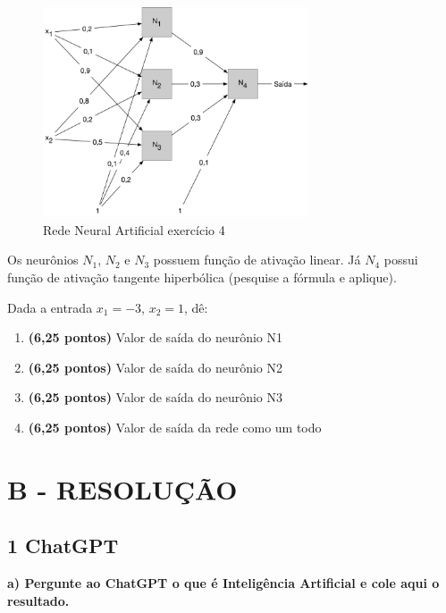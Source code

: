     \begin{figure}[H]
        \centering
        \includegraphics[width=0.7\textwidth]{apendices/fig/1_IAA001_3.png} 
        \caption{Rede Neural Artificial exercício 4}
    \end{figure}

    Os neurônios $N_1$, $N_2$ e $N_3$ possuem função de ativação linear. Já $N_4$ possui função de ativação tangente hiperbólica (pesquise a fórmula e aplique).

    Dada a entrada $x_1 = -3$, $x_2 = 1$, dê:
    \begin{enumerate}[label=\alph*)]
        \item \textbf{(6,25 pontos)} Valor de saída do neurônio N1
        \item \textbf{(6,25 pontos)} Valor de saída do neurônio N2
        \item \textbf{(6,25 pontos)} Valor de saída do neurônio N3
        \item \textbf{(6,25 pontos)} Valor de saída da rede como um todo
    \end{enumerate}

\section*{\textbf{B - RESOLUÇÃO}}
\setcounter{subsection}{0}

\subsection*{\textbf{1 ChatGPT}}
\begin{adjustwidth}{1em}{}
\textbf{a) Pergunte ao ChatGPT o que é Inteligência Artificial e cole aqui o resultado.}
\end{adjustwidth}

